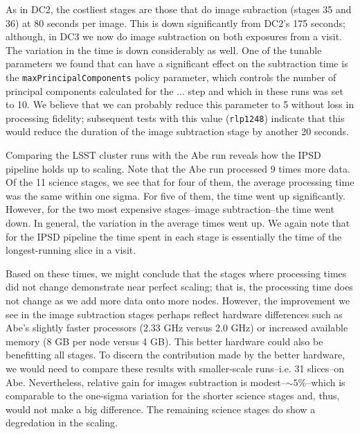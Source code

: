 As in DC2, the costliest stages are those that do image subraction
(stages 35 and 36) at 80 seconds per image.  This is down
significantly from DC2's 175 seconds; although, in DC3 we now do image
subtraction on both exposures from a visit.  The variation in the time
is down considerably as well.  One of the tunable parameters we found
that can have a significant effect on the subtraction time is the 
{\tt maxPrincipalComponents} policy parameter, which controls the number
of principal components calculated for the ... step and which in these
runs was set to 10.  We believe that we can probably reduce this
parameter to 5 without loss in processing fidelity; subsequent tests
with this value ({\tt rlp1248}) indicate that this would reduce the
duration of the image subtraction stage by another 20 seconds.

Comparing the LSST cluster runs with the Abe run reveals how the IPSD 
pipeline holds up to scaling.  Note that the Abe run processed 9 times
more data.  Of the 11 science stages, we see that for four of them,
the average processing time was the same within one sigma.  For five
of them, the time went up significantly.  However, for the two most
expensive stages--image subtraction--the time went down.  In general,
the variation in the average times went up.  We again note that for
the IPSD pipeline the time spent in each stage is essentially the time
of the longest-running slice in a visit.  

Based on these times, we might conclude that the stages where
processing times did not change demonstrate near perfect scaling; that
is, the processing time does not change as we add more data onto more
nodes.  However, the improvement we see in the image subtraction
stages perhaps reflect hardware differences such as Abe's slightly
faster processors (2.33 GHz versus 2.0 GHz) or increased available
memory (8 GB per node versus 4 GB).  This better hardware could also
be benefitting all stages.  To discern the contribution made by the
better hardware, we would need to compare these results with
smaller-scale runs--i.e. 31 slices--on Abe.  Nevertheless, relative
gain for images subtraction is modest--$\sim 5\%$--which is comparable
to the one-sigma variation for the shorter science stages and, thus,
would not make a big difference.  The remaining science stages do show
a degredation in the scaling.  

